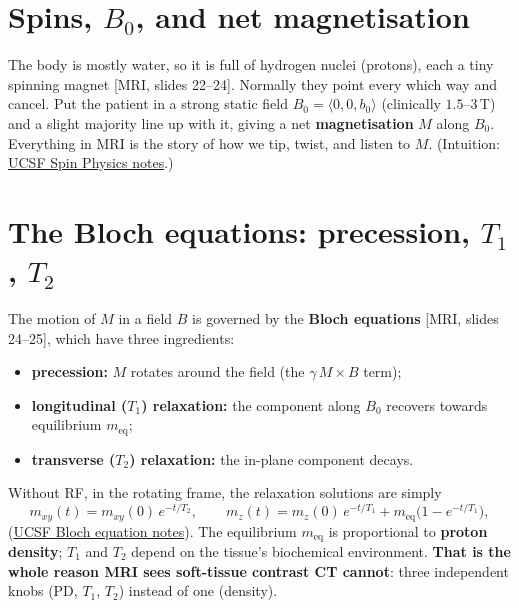 \documentclass[11pt]{article}
\newcommand{\deck}[1]{\textsf{\small[#1]}}
\begin{document}
\section{Spins, $B_0$, and net magnetisation}

The body is mostly water, so it is full of hydrogen nuclei (protons), each a
tiny spinning magnet \deck{MRI, slides 22--24}. Normally they point every which
way and cancel. Put the patient in a strong static field
$B_0=\langle 0,0,b_0\rangle$ (clinically $1.5$--$3$\,T) and a slight majority
line up with it, giving a net \textbf{magnetisation} $M$ along $B_0$. Everything
in MRI is the story of how we tip, twist, and listen to $M$. (Intuition:
\href{https://larsonlab.github.io/MRI-education-resources/Spin\%20Physics.html}{UCSF
Spin Physics notes}.)

\section{The Bloch equations: precession, $T_1$, $T_2$}

The motion of $M$ in a field $B$ is governed by the \textbf{Bloch equations}
\deck{MRI, slides 24--25}, which have three ingredients:
\begin{itemize}[nosep,leftmargin=*]
  \item \textbf{precession:} $M$ rotates around the field (the $\gamma\,M\times B$
  term);
  \item \textbf{longitudinal ($T_1$) relaxation:} the component along $B_0$
  recovers towards equilibrium $m_{\mathrm{eq}}$;
  \item \textbf{transverse ($T_2$) relaxation:} the in-plane component decays.
\end{itemize}
Without RF, in the rotating frame, the relaxation solutions are simply
\[
m_{xy}(t)=m_{xy}(0)\,e^{-t/T_2}, \qquad
m_z(t)=m_z(0)\,e^{-t/T_1}+m_{\mathrm{eq}}\big(1-e^{-t/T_1}\big),
\]
(\href{https://larsonlab.github.io/MRI-education-resources/Bloch\%20Equation.html}{UCSF
Bloch equation notes}). The equilibrium $m_{\mathrm{eq}}$ is proportional to
\textbf{proton density}; $T_1$ and $T_2$ depend on the tissue's biochemical
environment. \textbf{That is the whole reason MRI sees soft-tissue contrast CT
cannot}: three independent knobs (PD, $T_1$, $T_2$) instead of one (density).
\end{document}
